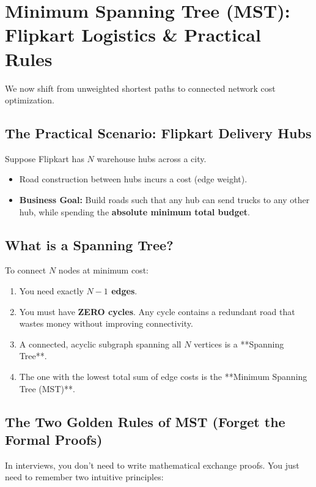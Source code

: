 \documentclass[10pt,journal,compsoc,onecolumn]{IEEEtran}
\begin{document}
\section{Minimum Spanning Tree (MST): Flipkart Logistics \& Practical Rules}
\label{sec:mst_practical}

We now shift from unweighted shortest paths to connected network cost optimization.

\subsection{The Practical Scenario: Flipkart Delivery Hubs}

Suppose Flipkart has $N$ warehouse hubs across a city.
\begin{itemize}
    \item Road construction between hubs incurs a cost (edge weight).
    \item \textbf{Business Goal:} Build roads such that any hub can send trucks to any other hub, while spending the \textbf{absolute minimum total budget}.
\end{itemize}

\subsection{What is a Spanning Tree?}

To connect $N$ nodes at minimum cost:
\begin{enumerate}
    \item You need exactly \textbf{$N - 1$ edges}.
    \item You must have \textbf{ZERO cycles}. Any cycle contains a redundant road that wastes money without improving connectivity.
    \item A connected, acyclic subgraph spanning all $N$ vertices is a **Spanning Tree**.
    \item The one with the lowest total sum of edge costs is the **Minimum Spanning Tree (MST)**.
\end{enumerate}

\subsection{The Two Golden Rules of MST (Forget the Formal Proofs)}

In interviews, you don't need to write mathematical exchange proofs. You just need to remember two intuitive principles:
\end{document}
